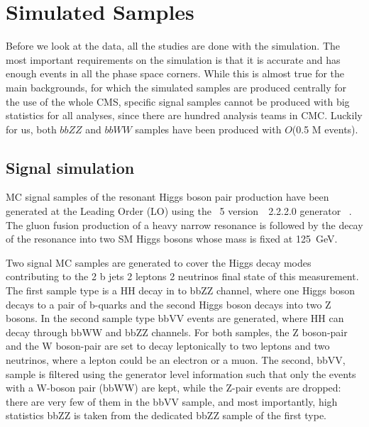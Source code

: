\chapter{Simulated Samples}
\label{ch:simulated_samples}

Before we look at the data, all the studies are done with the simulation. The most important requirements on the simulation is that it is accurate and has enough events in all the phase space corners. While this is almost true for the main backgrounds, for which the simulated samples are produced centrally for the use of the whole CMS, specific signal samples cannot be produced with big statistics for all analyses, since there are hundred analysis teams in CMC. Luckily for us, both $bbZZ$ and $bbWW$ samples have been produced with $O$(0.5 M events).

\section{Signal simulation\label{sec:signalMC}}




MC signal samples of the resonant Higgs boson pair production have been generated at the Leading Order (LO) using the \MADGRAPH~5 version\ ~2.2.2.0  generator ~\cite{Alwall:2014hca}. The gluon fusion production of a heavy narrow resonance is followed by the decay of the resonance into two SM Higgs bosons whose mass is fixed at 125~GeV.

Two signal MC samples are generated to cover the Higgs decay modes contributing to the 2 b jets 2 leptons 2 neutrinos final state of this measurement. The first sample type is a HH decay in to bbZZ channel, where one Higgs boson decays to a pair of b-quarks and the second Higgs boson decays into two Z bosons. In the second sample type bbVV events are generated, where HH can decay through bbWW and bbZZ channels. For both samples, the Z boson-pair and the W boson-pair are set to decay leptonically to two leptons and two neutrinos, where a lepton could be an electron or a muon. The second, bbVV, sample is filtered using the generator level information such that only the events with a W-boson pair (bbWW) are kept, while the Z-pair events are dropped: there are very few of them in the bbVV sample, and most importantly, high statistics bbZZ is taken from the dedicated bbZZ sample of the first type.

